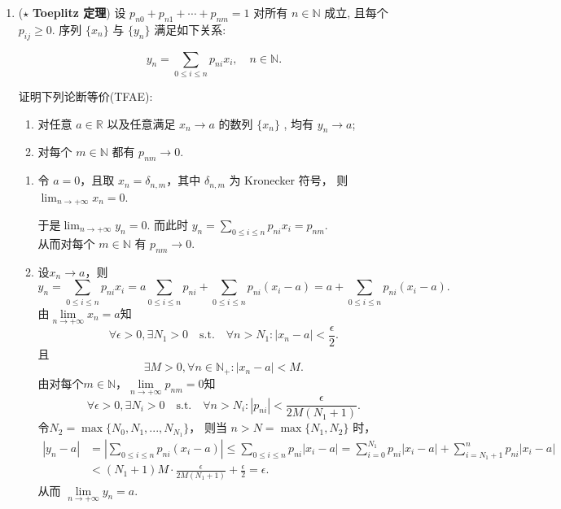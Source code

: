 \begin{enumerate}
    \item[15.]($\star$ \textbf{Toeplitz 定理}) 设 $p_{n0} + p_{n1} + \cdots + p_{nm} = 1$ 对所有 $n \in \mathbb{N}$ 成立, 
    且每个 $p_{ij} \geq 0$. 序列 $\{x_n\}$ 与 $\{y_n\}$ 满足如下关系:

    \[y_n = \sum_{0 \leq i \leq n} p_{ni} x_i, \quad n \in \mathbb{N}.\]

    证明下列论断等价(TFAE):
    \begin{enumerate}
        \item[(a)]对任意 $a \in \mathbb{R}$ 以及任意满足 $x_n \to a$ 的数列 $\{x_n\}$ , 均有 $y_n \to a$;
        \item[(b)]对每个 $m \in \mathbb{N}$ 都有 $p_{nm} \to 0$.
    \end{enumerate}
    \begin{solution}
        \begin{enumerate}
            \item[(a) $\Rightarrow$ (b)]
        令 $a=0$，且取 $\displaystyle x_{n}=\delta_{n,m}$，其中 $\delta_{n,m}$ 为 Kronecker 符号，
        则 $\displaystyle\lim_{n\to+\infty} x_{n}=0$.

        于是$\displaystyle\lim_{n\to+\infty}y_{n}=0$.
        而此时 $\displaystyle y_{n}=\underset{0\leq i\leq n}{\sum}p_{ni}x_{i}=p_{nm}$.\\
        从而对每个 $m\in\mathbb{N}$ 有 $p_{nm}\rightarrow0$.
            \item[(b) $\Rightarrow$ (a)]
            设$x_{n}\rightarrow a$，则
    \[
    y_{n}=\sum_{0\leq i\leq n}p_{ni}x_{i}=a\sum_{0\leq i\leq n}p_{ni}+\sum_{0\leq i\leq n}p_{ni}(x_{i}-a)=a+\sum_{0\leq i\leq n}p_{ni}(x_{i}-a).
    \]
    由$\underset{n\to+\infty}{\lim}x_{n}=a$知
    \[
    \forall \epsilon>0, \exists N_{1}>0 \quad \mathrm{s.t.} \quad \forall n>N_{1}: \left|x_{n}-a\right|<\frac{\epsilon}{2}.
    \]
    且
    \[
    \exists M>0, \forall n\in\mathbb{N}_{+}:\left|x_{n}-a\right|<M.
    \]
    由对每个$m\in\mathbb{N}$，$\underset{n\to+\infty}{\lim}p_{nm}=0$知
    \[
    \forall \epsilon>0, \exists N_{i}>0 \quad \mathrm{s.t.} \quad \forall n>N_{i}: \left|p_{ni}\right|<\frac{\epsilon}{2M(N_{1}+1)}.
    \]
    令$N_{2}=\max\{N_{0},N_{1},...,N_{N_{1}}\}$，
    则当 $n>N=\max\{N_{1},N_{2}\}$ 时，
    \[
    \begin{aligned}
        \left|y_{n}-a\right|
    &=\left|\sum_{0\leq i\leq n}p_{ni}(x_{i}-a)\right|
    \leq \sum_{0\leq i\leq n}p_{ni}\left|x_{i}-a\right|
    =\sum_{i=0}^{N_{1}}p_{ni}\left|x_{i}-a\right|+\sum_{i=N_{1}+1}^{n}p_{ni}\left|x_{i}-a\right|\\
    &<(N_{1}+1)M\cdot\frac{\epsilon}{2M(N_{1}+1)}+\frac{\epsilon}{2}=\epsilon.
    \end{aligned}
    \]
    从而 $\underset{n\to+\infty}{\lim}y_{n}=a$.
    \end{enumerate}
    \end{solution}
\end{enumerate}  

